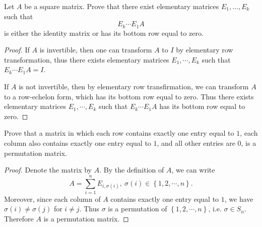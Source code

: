 \documentclass{article}
\begin{document}
\begin{solution}
\begin{figure}[htbp]
  \end{figure}
\end{solution}

\begin{problem}[I.2.10]
  Let $A$ be a square matrix. Prove that there exist elementary matrices
  $E_1, \ldots, E_k$ such that
  \[
  E_k \cdots E_1 A
  \]
  is either the identity matrix or has its bottom row equal to zero.
\end{problem}

\begin{proof}
  If \( A \) is invertible, then one can transform \( A \) to \( I \) by elementary row transformation, thus there exists elementary matrices \( E_1,\cdots,E_k \) such that \( E_k\cdots E_1A=I \). \par
  If \( A \) is not invertible, then by elementary row transfirmation, we can transform \( A \) to a row-echelon form, which has its bottom row equal to zero. Thus there exists elementary matrices \( E_1,\cdots,E_k \) such that \( E_k\cdots E_1A \) has its bottom row equal to zero.
\end{proof}

\begin{problem}[I.4.3]
  Prove that a matrix in which each row contains exactly one entry equal to $1$,
  each column also contains exactly one entry equal to $1$, and all other entries
  are $0$, is a permutation matrix.
\end{problem}

\begin{proof}
  Denote the matrix by \( A \). By the definition of \( A \), we can write
  \[ A=\sum_{i=1}^{n}E_{i,\sigma(i)},\ \sigma(i)\in \left\{1,2,\cdots,n\right\}. \]
  Moreover, since each column of \( A \) contains exactly one entry equal to \( 1 \), we have \( \sigma(i)\neq \sigma(j) \) for \( i\neq j \). Thus \( \sigma \) is a permutation of \( \left\{1,2,\cdots,n\right\} \), i.e. \( \sigma\in S_n \). Therefore \( A \) is a permutation matrix. 
\end{proof}
\end{document}
